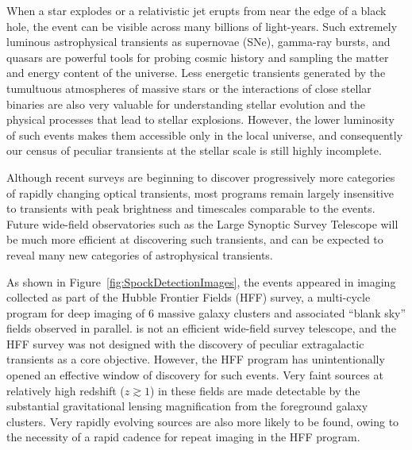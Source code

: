 
 When a star explodes or a relativistic jet erupts from near the edge
of a black hole, the event can be visible across many billions of
light-years.  Such extremely luminous astrophysical transients as
supernovae (SNe), gamma-ray bursts, and quasars are powerful tools for
probing cosmic history and sampling the matter and energy content of
the universe.  Less energetic transients generated by the tumultuous
atmospheres of massive stars or the interactions of close stellar
binaries are also very valuable for understanding stellar evolution
and the physical processes that lead to stellar explosions.  However,
the lower luminosity of such events makes them accessible only in
the local universe, and consequently our census of peculiar transients
at the stellar scale is still highly incomplete.


Although recent surveys are beginning to discover progressively more 
categories of rapidly changing optical
transients\cite{Kasliwal:2011a,Drout:2014}, most programs remain
largely insensitive to transients with peak brightness and timescales
comparable to the \spock events\cite{Berger:2013b}.  Future wide-field
observatories such as the Large Synoptic Survey
Telescope\cite{Tyson:2002} will be much more efficient at discovering
such transients, and can be expected to reveal many new categories of
astrophysical transients.

As shown in Figure~\ref{fig:SpockDetectionImages}, the \spock events
appeared in \HST imaging collected as part of
the Hubble Frontier Fields (HFF) survey\cite{Lotz:2017}, a multi-cycle
program for deep imaging of 6 massive galaxy clusters and associated
``blank sky'' fields observed in parallel.  \HST is not an efficient
wide-field survey telescope, and the HFF survey was not designed with
the discovery of peculiar extragalactic transients as a core
objective.  However, the HFF program has unintentionally opened an
effective window of discovery for such events.  Very faint sources at
relatively high redshift ($z\gtrsim1$) in these fields are made
detectable by the substantial gravitational lensing magnification from
the foreground galaxy clusters.  Very rapidly evolving sources are
also more likely to be found, owing to the necessity of a rapid cadence
for repeat imaging in the HFF program.

